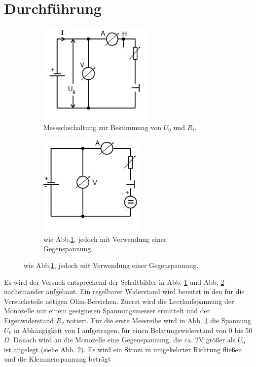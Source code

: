 \section{Durchführung}
\label{sec:Durchführung}
\begin{figure}
  \centering
  \begin{subfigure}{0.48\textwidth}
    \centering
    \includegraphics[height=5cm]{data/abb2.jpg}
    \caption{Messschschaltung zur Bestimmung von $U_0$ und $R_i$. \cite{V301}}
    \label{fig:abb2}
  \end{subfigure}
  \begin{subfigure}{0.48\textwidth}
    \centering
    \includegraphics[height=5cm]{data/abb3.jpg}
    \caption{wie Abb.\ref{fig:abb2}, jedoch mit Verwendung einer Gegenspannung. \cite{V301}}
    \label{fig:abb3}
  \end{subfigure}
  \label{fig:Phasen}
\end{figure}
Es wird der Versuch entsprechend der Schaltbilder in Abb. \ref{fig:abb2} und Abb. \ref{fig:abb3} nacheinander aufgebaut.
Ein regelbarer Widerstand wird benutzt in den für die Versuchsteile nötigen Ohm-Bereichen.
Zuerst wird die Leerlaufspannung der Monozelle mit einem geeigneten Spannungsmesser ermittelt und der Eigenwiderstand $R_v$ notiert.
Für die erste Messreihe wird in Abb. \ref{fig:abb2} die Spannung $U_k$ in Abhängigkeit von I aufgetragen, für einen Belatungswiderstand von 0 bis 50 $\Omega$.
Danach wird an die Monozelle eine Gegenspannung, die ca. 2V größer als $U_0$ ist angelegt (siehe Abb. \ref{fig:abb3}).
Es wird ein Strom in umgekehrter Richtung fließen und die Klemmenspannung beträgt
